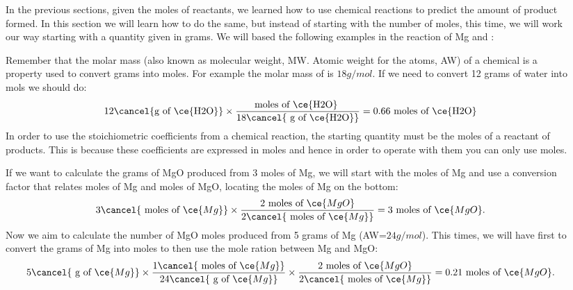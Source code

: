 \documentclass[main.tex]{subfiles}
\begin{document}
\begin{description}
\item[] 
In the previous sections, given the moles of reactants, we learned how to use chemical reactions to predict the amount of product formed. In this section we will learn how to do the same, but instead of starting with the number of moles, this time, we will work our way starting with a quantity given in grams. We will based the following examples in the reaction of Mg and :
\begin{center}\end{center}
\item[] 
Remember that the molar mass (also known as molecular weight, MW. Atomic weight for the atoms, AW) of a chemical is a property used to convert grams into moles. For example the molar mass of  is $18g/mol$. If we need to convert 12 grams of water into mols we should do:
 \begin{equation*}
12  \cancel{\text{g of \ce{H2O}}} \times 
\dfrac{\text{moles of \ce{H2O} }} { 18\cancel{\text{ g of \ce{H2O}}} } 
=\text{0.66 moles of \ce{H2O}}
\end{equation*}
In order to use the stoichiometric coefficients from a chemical reaction, the starting quantity must be the moles of a reactant of products. This is because these coefficients are expressed in moles and hence in order to operate with them you can only use moles. 
\item[] 
If we want to calculate the grams of MgO produced from 3 moles of Mg, we will start with the moles of Mg and use a conversion factor that relates moles of Mg and moles of MgO, locating the moles of Mg on the bottom:
\begin{equation*}
3\cancel{\text{ moles of }\ce{Mg}} \times \dfrac{\text{2 moles of }\ce{MgO}}{2\cancel{\text{ moles of }\ce{Mg}}}=3\text{ moles of }\ce{MgO}.
\end{equation*}
Now we aim to calculate the number of MgO moles produced from 5 grams of Mg (AW=$24g/mol$). This times, we will have first to convert the grams of Mg into moles to then use the mole ration between Mg and MgO:
\begin{equation*}
5\cancel{\text{ g of }\ce{Mg}}   \times  \dfrac{1 \cancel{\text{ moles of }\ce{Mg}}}{24\cancel{\text{ g of }\ce{Mg}}}
 \times \dfrac{\text{2 moles of }\ce{MgO}}{2\cancel{\text{ moles of }\ce{Mg}}}=0.21\text{ moles of }\ce{MgO}.
\end{equation*}


\end{description}
\end{document}
